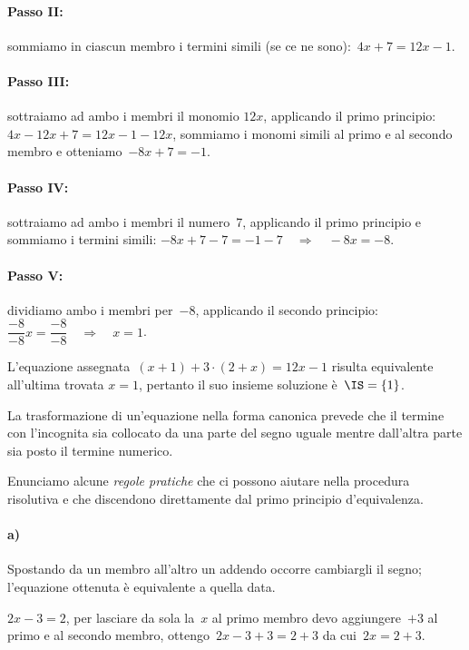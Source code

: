 \paragraph{Passo II:} sommiamo in ciascun membro i termini
simili (se ce ne sono):~$4x+7=12x-1$.

\paragraph{Passo III:} sottraiamo ad ambo i membri il monomio
$12x$, applicando il primo principio:~$4x-12x+7=12x-1-12x$, sommiamo i
monomi simili al primo e al secondo membro e otteniamo~$-8x+7=-1$.

\paragraph{Passo IV:} sottraiamo ad ambo i membri il numero~7,
applicando il primo principio e sommiamo i termini simili:
$-8x+7-7=-1-7\quad\Rightarrow\quad -8x=-8$.

\paragraph{Passo V:} dividiamo ambo i membri per~$-8$,
applicando il secondo principio:
$\dfrac{-8}{-8}x=\dfrac{-8}{-8}\quad\Rightarrow\quad x=1$.

L'equazione assegnata~$(x+1)+3\cdot (2+x)=12x-1$
risulta equivalente all'ultima trovata $x=1$, pertanto il
suo insieme soluzione è~$\IS = \{1\}$.

\vspace{1.10ex}\ovalbox{\risolvii \ref{ese:13.12}, \ref{ese:13.13}}

\osservazione
La trasformazione di un'equazione nella forma canonica
prevede che il termine con l'incognita sia collocato da
una parte del segno uguale mentre dall'altra parte sia
posto il termine numerico.

Enunciamo alcune \emph{regole pratiche} che ci possono aiutare nella
procedura risolutiva e che discendono direttamente dal primo principio
d'equivalenza.

\paragraph{a)} Spostando da un membro all'altro un addendo occorre
cambiargli il segno; l'equazione ottenuta è
equivalente a quella data.

$2x-3=2$, per lasciare da sola la~$x$ al primo membro devo aggiungere~$+3$ al primo e
al secondo membro, ottengo~$2x-3+3=2+3$ da cui~$2x=2+3$.

